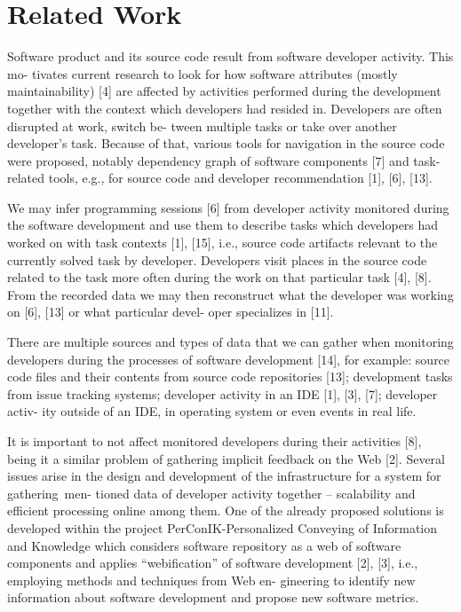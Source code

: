 \documentclass[a4paper]{llncs}
\begin{document}
\section{Related Work}

Software product and its source code result from software developer activity. This mo- tivates current research to look for how software attributes (mostly maintainability) [4] are affected by activities performed during the development together with the context which developers had resided in. Developers are often disrupted at work, switch be- tween multiple tasks or take over another developer’s task. Because of that, various tools for navigation in the source code were proposed, notably dependency graph of software components [7] and task-related tools, e.g., for source code and developer recommendation [1], [6], [13].

We may infer programming sessions [6] from developer activity monitored during the software development and use them to describe tasks which developers had worked on with task contexts [1], [15], i.e., source code artifacts relevant to the currently solved task by developer. Developers visit places in the source code related to the task more often during the work on that particular task [4], [8]. From the recorded data we may then reconstruct what the developer was working on [6], [13] or what particular devel- oper specializes in [11].

There are multiple sources and types of data that we can gather when monitoring developers during the processes of software development [14], for example: source code files and their contents from source code repositories [13]; development tasks
\newpage \noindent 
from issue tracking systems; developer activity in an IDE [1], [3], [7]; developer activ- ity outside of an IDE, in operating system or even events in real life.

It is important to not affect monitored developers during their activities [8], being it a similar problem of gathering implicit feedback on the Web [2]. Several issues arise in the design and development of the infrastructure for a system for gathering~men- tioned data of developer activity together – scalability and efficient processing online among them. One of the already proposed solutions is developed within the project PerConIK-Personalized Conveying of Information and Knowledge which considers software repository as a web of software components and applies “webification” of software development [2], [3], i.e., employing methods and techniques from Web en- gineering to identify new information about software development and propose new software metrics. 
\end{document}
